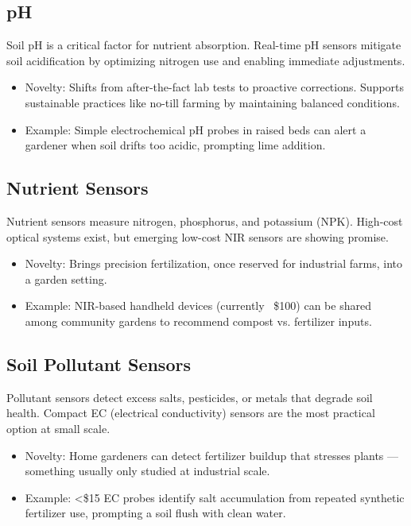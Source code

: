 \documentclass{sigchi}
\begin{document}
\subsection{pH}
Soil pH is a critical factor for nutrient absorption. Real-time pH sensors mitigate soil acidification by optimizing nitrogen use and enabling immediate adjustments.
\begin{itemize}
	\item Novelty: Shifts from after-the-fact lab tests to proactive corrections. Supports sustainable practices like no-till farming by maintaining balanced conditions.
	\item Example: Simple electrochemical pH probes in raised beds can alert a gardener when soil drifts too acidic, prompting lime addition.
\end{itemize}

\subsection{Nutrient Sensors}
Nutrient sensors measure nitrogen, phosphorus, and potassium (NPK). High-cost optical systems exist, but emerging low-cost NIR sensors are showing promise.
\begin{itemize}
	\item Novelty: Brings precision fertilization, once reserved for industrial farms, into a garden setting.
	\item Example: NIR-based handheld devices (currently ~\$100) can be shared among community gardens to recommend compost vs. fertilizer inputs.
\end{itemize}

\subsection{Soil Pollutant Sensors}
Pollutant sensors detect excess salts, pesticides, or metals that degrade soil health. Compact EC (electrical conductivity) sensors are the most practical option at small scale.
\begin{itemize}
	\item Novelty: Home gardeners can detect fertilizer buildup that stresses plants — something usually only studied at industrial scale.
	\item Example: <\$15 EC probes identify salt accumulation from repeated synthetic fertilizer use, prompting a soil flush with clean water.
\end{itemize}
\end{document}
